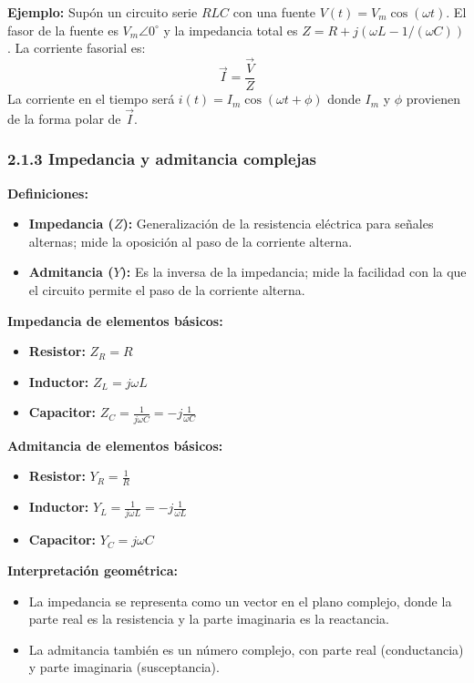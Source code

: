 \documentclass[12pt]{article}
\begin{document}
\textbf{Ejemplo:}
Supón un circuito serie $RLC$ con una fuente $V(t) = V_m \cos(\omega t)$. El fasor de la fuente es $V_m \angle 0^\circ$ y la impedancia total es $Z = R + j(\omega L - 1/(\omega C))$. La corriente fasorial es:
\[
    \vec{I} = \frac{\vec{V}}{Z}
\]
La corriente en el tiempo será $i(t) = I_m \cos(\omega t + \phi)$ donde $I_m$ y $\phi$ provienen de la forma polar de $\vec{I}$.

\vspace{0.5cm}
\subsubsection*{2.1.3 Impedancia y admitancia complejas}

\textbf{Definiciones:}
\begin{itemize}
    \item \textbf{Impedancia ($Z$):} Generalización de la resistencia eléctrica para señales alternas; mide la oposición al paso de la corriente alterna.
    \item \textbf{Admitancia ($Y$):} Es la inversa de la impedancia; mide la facilidad con la que el circuito permite el paso de la corriente alterna.
\end{itemize}

\textbf{Impedancia de elementos básicos:}
\begin{itemize}
    \item \textbf{Resistor:} $Z_R = R$
    \item \textbf{Inductor:} $Z_L = j\omega L$
    \item \textbf{Capacitor:} $Z_C = \frac{1}{j\omega C} = -j \frac{1}{\omega C}$
\end{itemize}

\textbf{Admitancia de elementos básicos:}
\begin{itemize}
    \item \textbf{Resistor:} $Y_R = \frac{1}{R}$
    \item \textbf{Inductor:} $Y_L = \frac{1}{j\omega L} = -j \frac{1}{\omega L}$
    \item \textbf{Capacitor:} $Y_C = j\omega C$
\end{itemize}

\textbf{Interpretación geométrica:}
\begin{itemize}
    \item La impedancia se representa como un vector en el plano complejo, donde la parte real es la resistencia y la parte imaginaria es la reactancia.
    \item La admitancia también es un número complejo, con parte real (conductancia) y parte imaginaria (susceptancia).
\end{itemize}
\end{document}
